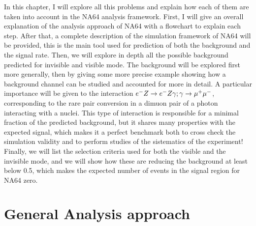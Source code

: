In this chapter, I will explore all this problems and explain how each of them are taken into account in the NA64 analysis framework. First, I will give an overall explanation of the analysis approach of NA64 with a flowchart to explain each step. After that, a complete description of the simulation framework of NA64 will be provided, this is the main tool used for prediction of both the background and the signal rate. Then, we will explore in depth all the possible background predicted for invisible and visible mode. The background will be explored first more generally, then by giving some more precise example showing how a background channel can be studied and accounted for more in detail. A particular importance will be given to the interaction $e^- Z \to e^- Z \gamma; \gamma \to \mu^+ \mu^-$, corresponding to the rare pair conversion in a dimuon pair of a photon interacting with a nuclei. This type of interaction is responsible for a minimal fraction of the predicted background, but it shares many properties with the expected signal, which makes it a perfect benchmark both to cross check the simulation validity and to perform studies of the sistematics of the experiment! Finally, we will list the selection criteria used for both the visible and the invisible mode, and we will show how these are reducing the background at least below 0.5, which makes the expected number of events in the signal region for NA64 zero.

\section{General Analysis approach}
\label{ch3:sec:analysis-approach}

